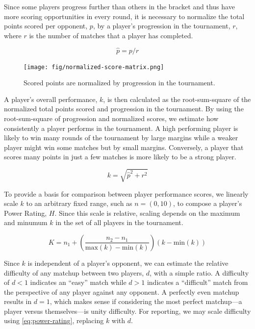 \documentclass[letterpaper, 10 pt, conference]{ieeeconf}  %
\begin{document}
Since some players progress further than others in the bracket and thus have more scoring opportunities in every round, it is necessary to normalize the total points scored per opponent, $p$, by a player's progression in the tournament, $r$, where $r$ is the number of matches that a player has completed. 

\begin{equation}
        \hat{p} = p/r
        \label{eq:normalized-score}
\end{equation}

\begin{figure}[ht]
        \texttt{[image: fig/normalized-score-matrix.png]}
        \label{fig:normalized-score}
        \centering
        \caption{Scored points are normalized by progression in the tournament.}
\end{figure}

A player's overall performance, $k$, is then calculated as the root-sum-square of the normalized total points scored and progression in the tournament. 
By using the root-sum-square of progression and normalized scores, we estimate how consistently a player performs in the tournament.
A high performing player is likely to win many rounds of the tournament by large margins while a weaker player might win some matches but by small margins.
Conversely, a player that scores many points in just a few matches is more likely to be a strong player.

\begin{equation}
        k = \sqrt{\hat{p}^2 + r^2}
        \label{eq:skill-indicator}
\end{equation}

To provide a basis for comparison between player performance scores, we linearly scale $k$ to an arbitrary fixed range, such as $n = (0,10)$, to compose a player's Power Rating, $H$. Since this scale is relative, scaling depends on the maximum and minumum $k$ in the set of all players in the tournament.

\begin{equation}
        K = n_1 + \left(\frac{n_2 - n_1}{\text{max}(k) - \text{min}(k)}\right)(k - \text{min}(k))  
        \label{eq:power-rating}
\end{equation}

Since $k$ is independent of a player's opponent, we can estimate the relative difficulty of any matchup between two players, $d$, with a simple ratio.
A difficulty of $d<1$ indicates an ``easy'' match while $d>1$ indicates a ``difficult'' match from the perspective of any player against any opponent.
A perfectly even matchup results in $d=1$, which makes sense if considering the most perfect matchup---a player versus themselves---is unity difficulty. 
For reporting, we may scale difficulty using \autoref{eq:power-rating}, replacing $k$ with $d$. 
\end{document}
